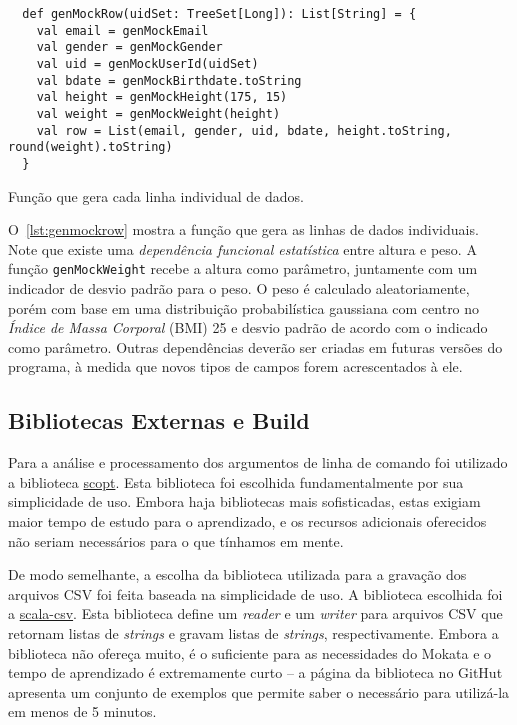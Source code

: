 \documentclass[a4paper,12pt]{scrartcl}
\begin{document}
\begin{listing}[h]
\begin{verbatim}
  def genMockRow(uidSet: TreeSet[Long]): List[String] = {
    val email = genMockEmail
    val gender = genMockGender
    val uid = genMockUserId(uidSet)
    val bdate = genMockBirthdate.toString
    val height = genMockHeight(175, 15)
    val weight = genMockWeight(height)
    val row = List(email, gender, uid, bdate, height.toString, round(weight).toString)
  }
\end{verbatim}
\caption{Função que gera cada linha individual de dados.}
\label{lst:genmockrow}
\end{listing}

O~\autoref{lst:genmockrow} mostra a função que gera as linhas de dados
individuais. Note que existe uma \emph{dependência funcional estatística} entre
altura e peso. A função \texttt{genMockWeight} recebe a altura como
parâmetro, juntamente com um indicador de desvio padrão para o peso. O peso é
calculado aleatoriamente, porém com base em uma distribuição probabilística
gaussiana com centro no \emph{Índice de Massa Corporal} (BMI) 25 e desvio padrão
de acordo com o indicado como parâmetro. Outras dependências deverão ser criadas
em futuras versões do programa, à medida que novos tipos de campos forem
acrescentados à ele.


\subsection{Bibliotecas Externas e Build}

Para a análise e processamento dos argumentos de linha de comando foi utilizado
a biblioteca \href{https://github.com/scopt/scopt}{scopt}. Esta biblioteca foi
escolhida fundamentalmente por sua simplicidade de uso. Embora haja bibliotecas
mais sofisticadas, estas exigiam maior tempo de estudo para o aprendizado, e os
recursos adicionais oferecidos não seriam necessários para o que tínhamos em
mente.

De modo semelhante, a escolha da biblioteca utilizada para a gravação dos
arquivos CSV foi feita baseada na simplicidade de uso. A biblioteca escolhida
foi a \href{https://github.com/tototoshi/scala-csv}{scala-csv}. Esta biblioteca
define um \emph{reader} e um \emph{writer} para arquivos CSV que retornam listas
de \emph{strings} e gravam listas de \emph{strings}, respectivamente. Embora a
biblioteca não ofereça muito, é o suficiente para as necessidades do
\textsf{Mokata} e o tempo de aprendizado é extremamente curto -- a página da
biblioteca no GitHut apresenta um conjunto de exemplos que permite saber o
necessário para utilizá-la em menos de 5 minutos.
\end{document}

